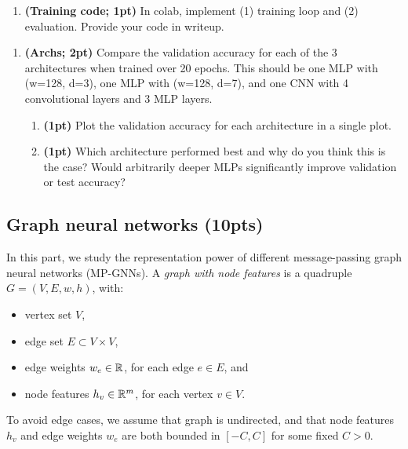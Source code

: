 \documentclass[12pt,letterpaper]{article}
\begin{document}
\begin{enumerate}[resume]
    \item \textbf{(Training code; 1pt)} In colab, implement (1) training loop and (2) evaluation. Provide your code in writeup.
    
\end{enumerate}

\begin{enumerate}[resume]

\item  \textbf{(Archs; 2pt)} Compare the validation accuracy for each of the 3 architectures when trained over 20 epochs. This should be one MLP with (w=128, d=3), one MLP with (w=128, d=7), and one CNN with 4 convolutional layers and 3 MLP layers.
\begin{enumerate}
    \item \textbf{(1pt)} Plot the validation accuracy for each architecture in a single plot.
    \item \textbf{(1pt)} Which architecture performed best and why do you think this is the case? Would arbitrarily deeper MLPs significantly improve validation or test accuracy?

\end{enumerate}
\end{enumerate}

\newpage
\subsection*{Graph neural networks (10pts)}

In this part, we study the representation power of different message-passing graph neural networks (MP-GNNs). A \emph{graph with node features} is a quadruple $G = (V,E,w,h)$, with:
\begin{itemize}
    \item vertex set $V$, 
    \item edge set $E \subset V \times V$, 
    \item edge weights $w_e \in \mathbb{R}$, for each edge $e \in E$, and 
    \item node features $h_v \in \mathbb{R}^m$, for each vertex $v \in V$. 
\end{itemize} To avoid edge cases, we assume that graph is undirected, and that node features $h_v$ and edge weights $w_e$ are both bounded in $[-C,C]$ for some fixed $C > 0$. 
\end{document}
